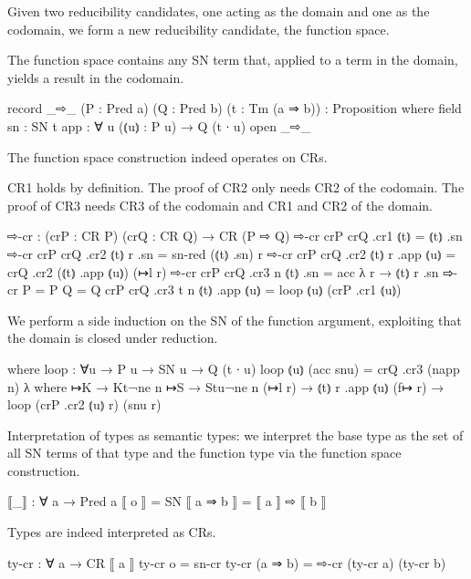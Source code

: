 Given two reducibility candidates, one acting as the domain
and one as the codomain, we form a new reducibility candidate,
the function space.

The function space contains any SN term that, applied to a term
in the domain, yields a result in the codomain.

\begin{code}
record _⇨_ (P : Pred a) (Q : Pred b) (t : Tm (a ⇒ b)) : Proposition where
  field
    sn   : SN t
    app  : ∀ {u} (⦅u⦆ : P u) → Q (t ∙ u)
open _⇨_
\end{code}

The function space construction indeed operates on CRs.

CR1 holds by definition.
The proof of CR2 only needs CR2 of the codomain.
The proof of CR3 needs CR3 of the codomain and CR1 and CR2 of the domain.

\begin{code}
⇨-cr : (crP : CR P) (crQ : CR Q) → CR (P ⇨ Q)
⇨-cr                  crP crQ .cr1 ⦅t⦆                  = ⦅t⦆ .sn
⇨-cr                  crP crQ .cr2 ⦅t⦆ r .sn            = sn-red (⦅t⦆ .sn) r
⇨-cr                  crP crQ .cr2 ⦅t⦆ r .app ⦅u⦆       = crQ .cr2 (⦅t⦆ .app ⦅u⦆) (↦l r)
⇨-cr                  crP crQ .cr3      n ⦅t⦆ .sn       = acc λ r → ⦅t⦆ r .sn
⇨-cr {P = P} {Q = Q}  crP crQ .cr3 {t}  n ⦅t⦆ .app ⦅u⦆  = loop ⦅u⦆ (crP .cr1 ⦅u⦆)
\end{code}

  We perform a side induction on the SN of the function argument,
  exploiting that the domain is closed under reduction.

\begin{code}
  where
  loop : ∀{u} → P u → SN u → Q (t ∙ u)
  loop ⦅u⦆ (acc snu) = crQ .cr3 (napp n) λ where
    ↦K      → Kt¬ne n
    ↦S      → Stu¬ne n
    (↦l r)  → ⦅t⦆ r .app ⦅u⦆
    (f↦ r)  → loop (crP .cr2 ⦅u⦆ r) (snu r)
\end{code}


Interpretation of types as semantic types:
we interpret the base type as the set of all SN terms of that type
and the function type via the function space construction.

\begin{code}
⟦_⟧ : ∀ a → Pred a
⟦ o ⟧      = SN
⟦ a ⇒ b ⟧  = ⟦ a ⟧ ⇨ ⟦ b ⟧
\end{code}

Types are indeed interpreted as CRs.

\begin{code}
ty-cr : ∀ a → CR ⟦ a ⟧
ty-cr o        = sn-cr
ty-cr (a ⇒ b)  = ⇨-cr (ty-cr a) (ty-cr b)
\end{code}

